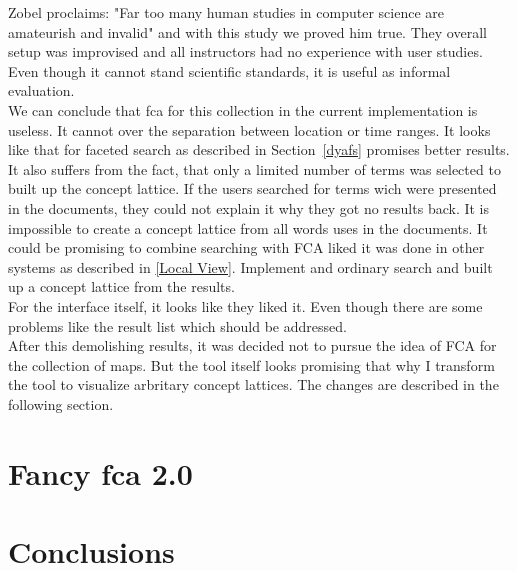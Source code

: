 \documentclass[11pt]{report}
\begin{document}
 Zobel \cite{Zobel2004} proclaims: "Far too many human studies in computer science are amateurish and invalid" and with this study we proved him true. They overall setup was improvised and all instructors had no experience with user studies. Even though it cannot stand scientific standards, it is useful as informal evaluation. \\
 
 We can conclude that \acrshort{fca} for this collection in the current implementation is useless. It cannot over the separation between location or time ranges. It looks like that for faceted search as described in Section~\ref{dyafs} promises better results. \\
 
 It also suffers from the fact, that only a limited number of terms was selected to built up the concept lattice. If the users searched for terms wich were presented in the documents, they could not explain it why they got no results back. It is impossible to create a concept lattice from all words uses in the documents. It could be promising to combine searching with FCA liked it was done in other systems as described in \ref{Local View}. Implement and ordinary search and built up a concept lattice from the results. \\
 
 For the interface itself, it looks like they liked it. Even though there are some problems like the result list which should be addressed. \\
 
 After this demolishing results, it was decided not to pursue the idea of FCA for the collection of maps. But the tool itself looks promising that why I transform the tool to visualize arbritary concept lattices. The changes are described in the following section.
 
\chapter{Fancy \acrshort{fca} 2.0}
\label{Fancy 2.0}

\blindtext

\chapter{Conclusions}
\label{Conclusions}

\blindtext

\newpage


\end{document}

